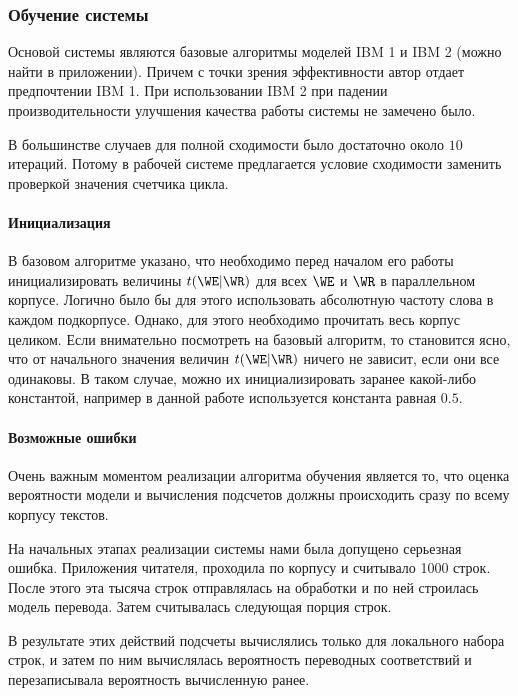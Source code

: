 \subsubsection{Обучение системы}

Основой системы являются базовые алгоритмы моделей IBM 1 и IBM 2 
(можно найти в приложении).
Причем с точки зрения эффективности автор отдает предпочтении IBM 1.
При использовании IBM 2 при падении производительности 
улучшения качества работы системы не замечено было.

В большинстве случаев 
для полной сходимости было достаточно около $10$ итераций. 
Потому в рабочей системе предлагается условие сходимости заменить 
проверкой значения счетчика цикла. 

\paragraph{Инициализация}

В базовом алгоритме указано, что необходимо перед началом его работы 
инициализировать величины $t(\WE|\WR)$ для всех $\WE$ и $\WR$ 
в параллельном корпусе. Логично было бы для этого использовать абсолютную
частоту слова в каждом подкорпусе. Однако, для этого необходимо 
прочитать весь корпус целиком. Если внимательно посмотреть на базовый 
алгоритм, то становится ясно, что от начального значения величин
$t(\WE|\WR)$ ничего не зависит, если они все одинаковы.
В таком случае, можно их инициализировать 
заранее какой-либо константой, например 
в данной работе используется константа равная $0.5$.
 
\paragraph{Возможные ошибки}

Очень важным моментом реализации алгоритма обучения является то,
что оценка вероятности модели и вычисления подсчетов должны происходить
сразу по всему корпусу текстов.

На начальных этапах реализации системы нами была допущено серьезная ошибка.
Приложения читателя, проходила по корпусу и считывало 1000 строк.
После этого эта тысяча строк отправлялась на обработки и по ней строилась модель
перевода. Затем считывалась следующая порция строк.

В результате этих действий подсчеты вычислялись только для локального набора строк,
и затем по ним вычислялась вероятность переводных соответствий и перезаписывала 
вероятность вычисленную ранее.

